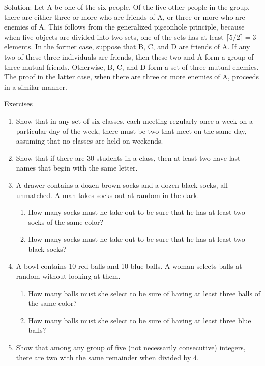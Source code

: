 \documentclass[11pt,a4paper]{book}
\begin{document}
\begin{enumerate}[label=Example~\arabic*]
Solution: Let A be one of the six people.
Of the five other people in the group, there are either three or more who are friends of A, or three or more who are enemies of A.
This follows from the generalized pigeonhole principle, because when five objects are divided into two sets, one of the sets has at least $\lceil 5/2\rceil = 3$ elements.
In the former case, suppose that B, C, and D are friends of A.
If any two of these three individuals are friends, then these two and A form a group of three mutual friends.
Otherwise, B, C, and D form a set of three mutual enemies.
The proof in the latter case, when there are three or more enemies of A, proceeds in a similar manner.

\end{enumerate}
Exercises
\begin{enumerate}
\item Show that in any set of six classes, each meeting regularly once a week on a particular day of the week, there must be two that meet on the same day, assuming that no classes are held on weekends.
\item Show that if there are 30 students in a class, then at least two have last names that begin with the same letter.
\item A drawer contains a dozen brown socks and a dozen black socks, all unmatched.
A man takes socks out at random in the dark.
\begin{enumerate}[label=(\alph*)]
\item How many socks must he take out to be sure that he has at least two socks of the same color?
\item How many socks must he take out to be sure that he has at least two black socks?
\end{enumerate}
\item A bowl contains 10 red balls and 10 blue balls.
A woman selects balls at random without looking at them.
\begin{enumerate}[label=(\alph*)]
\item How many balls must she select to be sure of having at least three balls of the same color?
\item How many balls must she select to be sure of having at least three blue balls?
\end{enumerate}
\item Show that among any group of five (not necessarily consecutive) integers, there are two with the same remainder when divided by 4.

\end{enumerate}
\end{document}
